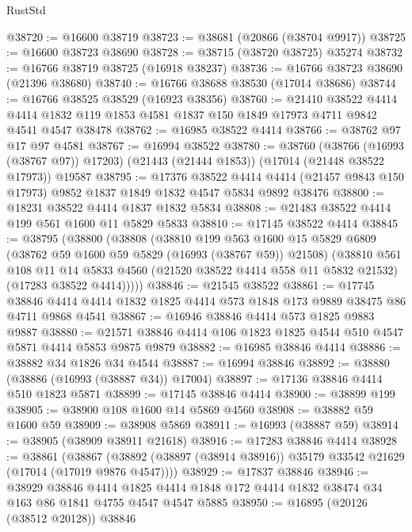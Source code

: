 \begin{lexlean}{RustStd}
\begin{coremodule}
{\begin{coremodule}
{{{{{{{{{{{{{{{{{{{{{{{{{{{{{{{{{{{{{{{{{{{{{{{{{{{{{{{@38720 := @16600 @38719
@38723 := @38681 (@20866 (@38704 @9917))
@38725 := @16600 @38723 @38690
@38728 := @38715 (@38720 @38725) @35274
@38732 := @16766 @38719 @38725 (@16918 @38237)
@38736 := @16766 @38723 @38690 (@21396 @38680)
@38740 := @16766 @38688 @38530 (@17014 @38686)
@38744 := @16766 @38525 @38529 (@16923 @38356)
@38760 := @21410
    @38522
    @4414
    @4414
    @1832
    @119
    @1853
    @4581
    @1837
    @150
    @1849
    @17973
    @4711
    @9842
    @4541
    @4547
    @38478
@38762 := @16985 @38522 @4414
@38766 := @38762 @97 @17 @97 @4581
@38767 := @16994 @38522
@38780 := @38760
    (@38766 (@16993 (@38767 @97)) @17203)
    (@21443 (@21444 @1853))
    (@17014 (@21448 @38522 @17973))
    @19587
@38795 := @17376
    @38522
    @4414
    @4414
    (@21457 @9843 @150 @17973)
    @9852
    @1837
    @1849
    @1832
    @4547
    @5834
    @9892
    @38476
@38800 := @18231 @38522 @4414 @1837 @1832 @5834
@38808 := @21483 @38522 @4414 @199 @561 @1600 @11 @5829 @5833
@38810 := @17145 @38522 @4414
@38845 := @38795
    (@38800
      (@38808
        (@38810
          @199
          @563
          @1600
          @15
          @5829
          @6809
          (@38762 @59 @1600 @59 @5829 (@16993 (@38767 @59)) @21508)
          (@38810
            @561
            @108
            @11
            @14
            @5833
            @4560
            (@21520 @38522 @4414 @558 @11 @5832 @21532)
            (@17283 @38522 @4414)))))
@38846 := @21545 @38522
@38861 := @17745
    @38846
    @4414
    @4414
    @1832
    @1825
    @4414
    @573
    @1848
    @173
    @9889
    @38475
    @86
    @4711
    @9868
    @4541
@38867 := @16946 @38846 @4414 @573 @1825 @9883 @9887
@38880 := @21571 @38846 @4414 @106 @1823 @1825 @4544 @510 @4547 @5871 @4414 @5853 @9875 @9879
@38882 := @16985 @38846 @4414
@38886 := @38882 @34 @1826 @34 @4544
@38887 := @16994 @38846
@38892 := @38880 (@38886 (@16993 (@38887 @34)) @17004)
@38897 := @17136 @38846 @4414 @510 @1823 @5871
@38899 := @17145 @38846 @4414
@38900 := @38899 @199
@38905 := @38900 @108 @1600 @14 @5869 @4560
@38908 := @38882 @59 @1600 @59
@38909 := @38908 @5869
@38911 := @16993 (@38887 @59)
@38914 := @38905 (@38909 @38911 @21618)
@38916 := @17283 @38846 @4414
@38928 := @38861
    (@38867 (@38892 (@38897 (@38914 @38916)) @35179 @33542 @21629 (@17014 (@17019 @9876 @4547))))
@38929 := @17837 @38846
@38946 := @38929
    @38846
    @4414
    @1825
    @4414
    @1848
    @172
    @4414
    @1832
    @38474
    @34
    @163
    @86
    @1841
    @4755
    @4547
    @4547
    @5885
@38950 := @16895 (@20126 (@38512 @20128)) @38846
}}}}}}}}}}}}}}}}}}}}}}}}}}}}}}}}}}}}}}}}}}}}}}}}}}}}}}}
\end{coremodule}}
\end{coremodule}
\end{lexlean}
